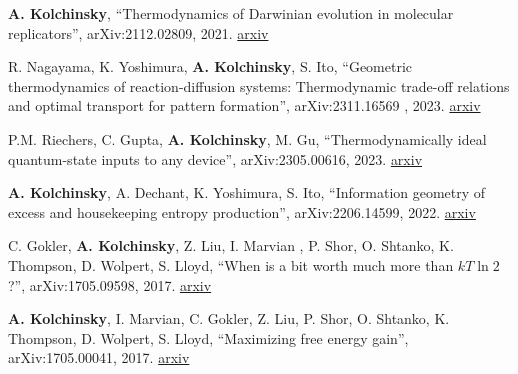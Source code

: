 
\textbf{A. Kolchinsky}, ``Thermodynamics of Darwinian evolution in molecular replicators'', arXiv:2112.02809, 2021. \href{http://arxiv.org/abs/2112.02809}{arxiv} 

R. Nagayama, K. Yoshimura, \textbf{A. Kolchinsky}, S. Ito, ``Geometric thermodynamics of reaction-diffusion systems: Thermodynamic trade-off relations and optimal transport for pattern formation'', arXiv:2311.16569 , 2023. \href{https://arxiv.org/abs/2311.16569}{arxiv}
 
P.M. Riechers, C. Gupta, \textbf{A. Kolchinsky}, M. Gu, ``Thermodynamically ideal quantum-state inputs to any device'', arXiv:2305.00616, 2023. \href{http://arxiv.org/abs/2305.00616}{arxiv}

\textbf{A. Kolchinsky}, A. Dechant, K. Yoshimura, S. Ito, 
``Information geometry of excess and housekeeping entropy production'', arXiv:2206.14599, 2022. \href{https://arxiv.org/abs/2206.14599}{arxiv}

C. Gokler, \textbf{A. Kolchinsky}, Z. Liu, I. Marvian , P. Shor, O. Shtanko, K. Thompson, D. Wolpert, S. Lloyd, ``When is a bit worth much more than $kT \ln 2$?'', arXiv:1705.09598, 2017. \href{https://arxiv.org/abs/1705.09598}{arxiv}

\textbf{A. Kolchinsky}, I. Marvian, C. Gokler, Z. Liu, P. Shor, O. Shtanko, K. Thompson, D. Wolpert, S. Lloyd, ``Maximizing free energy gain'', arXiv:1705.00041, 2017. \href{https://arxiv.org/abs/1705.00041}{arxiv}

